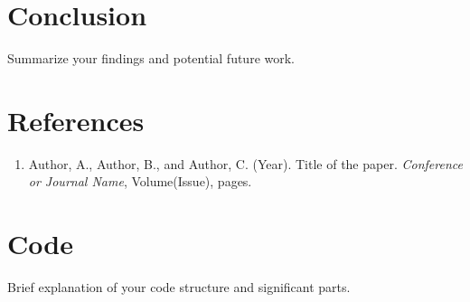 \documentclass[11pt]{article}
\begin{document}
\section{Conclusion}
Summarize your findings and potential future work.

\section*{References}
\begin{enumerate}
    \item Author, A., Author, B., and Author, C. (Year). Title of the paper. \textit{Conference or Journal Name}, Volume(Issue), pages.
\end{enumerate}

\appendix
\section{Code}
Brief explanation of your code structure and significant parts.
\end{document}
